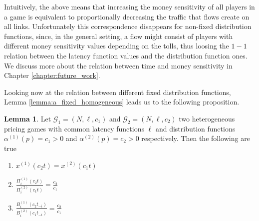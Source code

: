 \documentclass[10pt,a4paper]{book}
\newcommand{\Gm}{\mathcal{G}}
\theoremstyle{definition}
\newtheorem{lemma}[definition]{Lemma}
\theoremstyle{comment}
\begin{document}
Intuitively, the above means that increasing the money sensitivity of all players in a game is equivalent to proportionally decreasing the traffic that flows create on all links.
Unfortunately this correspondence  disappears for non-fixed distribution functions, since, in the general setting, a flow might consist of players with different money sensitivity values depending on the tolls, thus loosing the $1-1$ relation between the latency function values and the distribution function ones.
We discuss more about the relation between time and money sensitivity in Chapter \ref{chapter:future_work}.

Looking now at the relation between different fixed distribution functions, Lemma \ref{lemma:a_fixed_homogeneous} leads us to the following proposition.
\begin{lemma}
	\label{lemma:a_fixed_c_relation}
	Let $\Gm_1 = (N, \ell, c_1)$ and $\Gm_2 = (N, \ell, c_2)$ two heterogeneous pricing games with common latency functions $\ell$ and distribution functions $\alpha^{(1)}(p) = c_1 > 0$ and $\alpha^{(2)}(p) = c_2 > 0$ respectively.
	Then the following are true
	\begin{enumerate}[$(i)$]
		\item $x^{(1)}(c_2 t) = x^{(2)}(c_1 t)$
		\item $\frac{\Pi_i^{(1)}(c_2 t)}{\Pi_i^{(2)}(c_1 t)} = \frac{c_2}{c_1}$
		\item $\frac{B_i^{(1)}(c_2t_{-i})}{B_i^{(2)}(c_1 t_{-i})} = \frac{c_2}{c_1}$
	\end{enumerate}
\end{lemma}
\end{document}
